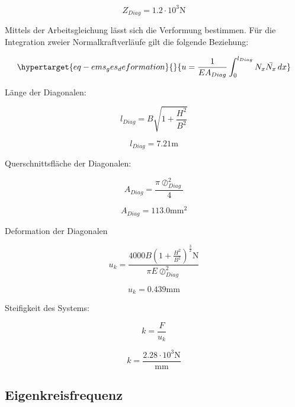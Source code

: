 \documentclass[
  letterpaper,
  DIV=11]{scrreprt}
\begin{document}
\begin{equation}Z_{Diag} = 1.2 \cdot 10^{3} \text{N}\end{equation}

Mittels der Arbeitsgleichung lässt sich die Verformung bestimmen. Für
die Integration zweier Normalkraftverläufe gilt die folgende Beziehung:

\begin{equation}\protect\hypertarget{eq-ems_ges_deformation}{}{
u = \frac{1}{EA_{Diag}}  \int_{0}^{l_{Diag}} N_x\bar{N_x} \,dx
}\label{eq-ems_ges_deformation}\end{equation}

Länge der Diagonalen:

\begin{equation}l_{Diag} = B \sqrt{1 + \frac{H^{2}}{B^{2}}}\end{equation}

\begin{equation}l_{Diag} = 7.21 \text{m}\end{equation}

Querschnittsfläche der Diagonalen:

\begin{equation}A_{Diag} = \frac{\pi \oslash_{Diag}^{2}}{4}\end{equation}

\begin{equation}A_{Diag} = 113.0 \text{mm}^{2}\end{equation}

Deformation der Diagonalen

\begin{equation}u_{k} = \frac{4000 B \left(1 + \frac{H^{2}}{B^{2}}\right)^{\frac{3}{2}} \text{N}}{\pi E \oslash_{Diag}^{2}}\end{equation}

\begin{equation}u_{k} = 0.439 \text{mm}\end{equation}

Steifigkeit des Systems:

\begin{equation}k = \frac{F}{u_{k}}\end{equation}

\begin{equation}k = \frac{2.28 \cdot 10^{3} \text{N}}{\text{mm}}\end{equation}

\hypertarget{eigenkreisfrequenz-4}{%
\subsection{Eigenkreisfrequenz}\label{eigenkreisfrequenz-4}}
\end{document}

